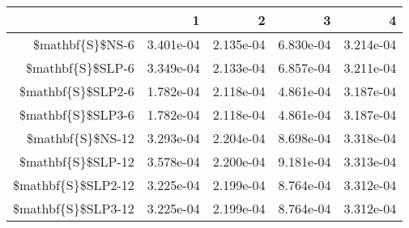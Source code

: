 \begin{table}[ht]
\centering
\begin{tabular}{rrrrr}
  \hline
 & 1 & 2 & 3 & 4 \\ 
  \hline
\$mathbf\{S\}\$NS-6 & 3.401e-04 & 2.135e-04 & 6.830e-04 & 3.214e-04 \\ 
  \$mathbf\{S\}\$SLP-6 & 3.349e-04 & 2.133e-04 & 6.857e-04 & 3.211e-04 \\ 
  \$mathbf\{S\}\$SLP2-6 & 1.782e-04 & 2.118e-04 & 4.861e-04 & 3.187e-04 \\ 
  \$mathbf\{S\}\$SLP3-6 & 1.782e-04 & 2.118e-04 & 4.861e-04 & 3.187e-04 \\ 
  \$mathbf\{S\}\$NS-12 & 3.293e-04 & 2.204e-04 & 8.698e-04 & 3.318e-04 \\ 
  \$mathbf\{S\}\$SLP-12 & 3.578e-04 & 2.200e-04 & 9.181e-04 & 3.313e-04 \\ 
  \$mathbf\{S\}\$SLP2-12 & 3.225e-04 & 2.199e-04 & 8.764e-04 & 3.312e-04 \\ 
  \$mathbf\{S\}\$SLP3-12 & 3.225e-04 & 2.199e-04 & 8.764e-04 & 3.312e-04 \\ 
   \hline
\end{tabular}
\end{table}
